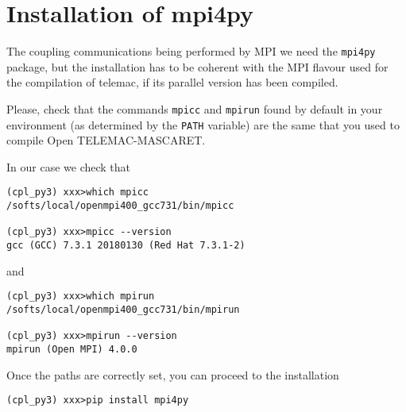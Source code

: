 \section{Installation of mpi4py}\label{ann:venv_mpi4py}
The coupling communications being performed by MPI we need the
\texttt{mpi4py} package, but the installation has to be coherent with
the MPI flavour used for the compilation of telemac, if its parallel
version has been compiled.

Please, check that the commands \texttt{mpicc} and \texttt{mpirun}
found by default in your environment (as determined by the
\texttt{PATH} variable) are the same that you used to compile Open
TELEMAC-MASCARET.

In our case we check that
\begin{verbatim}
(cpl_py3) xxx>which mpicc
/softs/local/openmpi400_gcc731/bin/mpicc

(cpl_py3) xxx>mpicc --version
gcc (GCC) 7.3.1 20180130 (Red Hat 7.3.1-2)
\end{verbatim}
and
\begin{verbatim}
(cpl_py3) xxx>which mpirun
/softs/local/openmpi400_gcc731/bin/mpirun

(cpl_py3) xxx>mpirun --version
mpirun (Open MPI) 4.0.0
\end{verbatim}

Once the paths are correctly set, you can proceed to the installation
\begin{verbatim}
(cpl_py3) xxx>pip install mpi4py
\end{verbatim}

